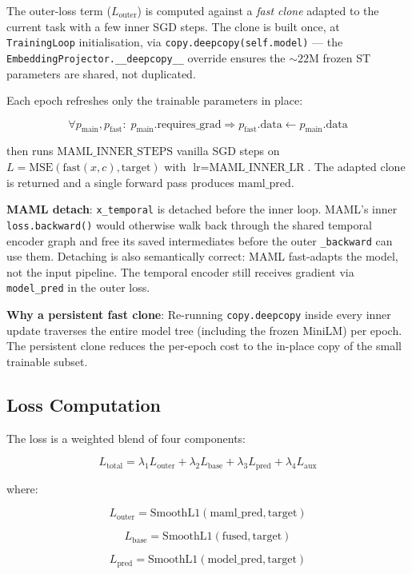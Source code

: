 \documentclass[12pt]{article}
\begin{document}
The outer-loss term ($L_{\text{outer}}$) is computed against a
\emph{fast clone} adapted to the current task with a few inner SGD steps.
The clone is built once, at \texttt{TrainingLoop} initialisation, via
\texttt{copy.deepcopy(self.model)} — the
\texttt{EmbeddingProjector.\_\_deepcopy\_\_} override ensures the
$\sim 22$M frozen ST parameters are shared, not duplicated.

Each epoch refreshes only the trainable parameters in place:

\[
  \forall p_{\text{main}},p_{\text{fast}}: \;
  p_{\text{main}}.\text{requires\_grad} \Rightarrow
  p_{\text{fast}}.\text{data} \leftarrow p_{\text{main}}.\text{data}
\]

then runs $\text{MAML\_INNER\_STEPS}$ vanilla SGD steps on
$L = \text{MSE}(\text{fast}(x, c), \text{target})$ with
$\text{lr} = \text{MAML\_INNER\_LR}$. The adapted clone is returned
and a single forward pass produces $\text{maml\_pred}$.

\textbf{MAML detach}: \texttt{x\_temporal} is detached before the inner
loop. MAML's inner \texttt{loss.backward()} would otherwise walk back
through the shared temporal encoder graph and free its saved intermediates
before the outer \texttt{\_backward} can use them. Detaching is also
semantically correct: MAML fast-adapts the model, not the input pipeline.
The temporal encoder still receives gradient via \texttt{model\_pred} in
the outer loss.

\textbf{Why a persistent fast clone}: Re-running \texttt{copy.deepcopy}
inside every inner update traverses the entire model tree (including the
frozen MiniLM) per epoch. The persistent clone reduces the per-epoch cost
to the in-place copy of the small trainable subset.

\subsection{Loss Computation}

The loss is a weighted blend of four components:

\[
  L_{\text{total}} = \lambda_1 L_{\text{outer}} + \lambda_2 L_{\text{base}}
    + \lambda_3 L_{\text{pred}} + \lambda_4 L_{\text{aux}}
\]

where:

\[
  L_{\text{outer}} = \text{SmoothL1}(\text{maml\_pred}, \text{target})
\]

\[
  L_{\text{base}} = \text{SmoothL1}(\text{fused}, \text{target})
\]

\[
  L_{\text{pred}} = \text{SmoothL1}(\text{model\_pred}, \text{target})
\]
\end{document}
